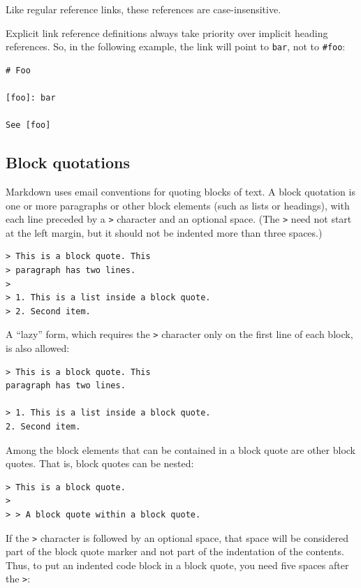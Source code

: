 \documentclass[
]{article}
\begin{document}
Like regular reference links, these references are case-insensitive.

Explicit link reference definitions always take priority over implicit
heading references. So, in the following example, the link will point to
\texttt{bar}, not to \texttt{\#foo}:

\begin{verbatim}
# Foo

[foo]: bar

See [foo]
\end{verbatim}

\hypertarget{block-quotations}{%
\subsection{Block quotations}\label{block-quotations}}

Markdown uses email conventions for quoting blocks of text. A block
quotation is one or more paragraphs or other block elements (such as
lists or headings), with each line preceded by a \texttt{\textgreater{}}
character and an optional space. (The \texttt{\textgreater{}} need not
start at the left margin, but it should not be indented more than three
spaces.)

\begin{verbatim}
> This is a block quote. This
> paragraph has two lines.
>
> 1. This is a list inside a block quote.
> 2. Second item.
\end{verbatim}

A ``lazy'' form, which requires the \texttt{\textgreater{}} character
only on the first line of each block, is also allowed:

\begin{verbatim}
> This is a block quote. This
paragraph has two lines.

> 1. This is a list inside a block quote.
2. Second item.
\end{verbatim}

Among the block elements that can be contained in a block quote are
other block quotes. That is, block quotes can be nested:

\begin{verbatim}
> This is a block quote.
>
> > A block quote within a block quote.
\end{verbatim}

If the \texttt{\textgreater{}} character is followed by an optional
space, that space will be considered part of the block quote marker and
not part of the indentation of the contents. Thus, to put an indented
code block in a block quote, you need five spaces after the
\texttt{\textgreater{}}:
\end{document}

